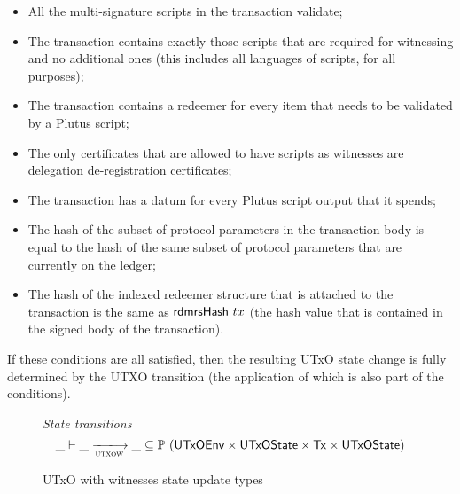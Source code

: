 \begin{itemize}

    \item All the multi-signature scripts in the transaction validate;

    \item The transaction contains exactly those scripts that are required for witnessing and no
    additional ones (this includes all languages of scripts, for all purposes);

    \item The transaction contains a redeemer for every item that needs to be  validated
      by a Plutus script;

    \item The only certificates that are allowed to have scripts as witnesses
    are delegation de-registration certificates;

    \item The transaction has a datum for every Plutus script output that it spends;

    \item
    The hash of the subset of protocol parameters in the transaction body is equal to
    the hash of the same subset of protocol parameters that are currently on the ledger;

    \item The hash of the indexed redeemer structure that is attached to the transaction is
    the same as $\mathsf{rdmrsHash}~{tx}$ (the hash value that is contained in the signed body of
    the transaction).

\end{itemize}

If these conditions are all satisfied, then the resulting UTxO state change is fully determined
by the UTXO transition (the application of which is also part of the conditions).

\begin{figure}[htb]
  \emph{State transitions}
  \begin{equation*}
    \_ \vdash
    \var{\_} \trans{utxow}{\_} \var{\_}
    \subseteq \powerset (\UTxOEnv \times \UTxOState \times \Tx \times \UTxOState)
  \end{equation*}
  \caption{UTxO with witnesses state update types}
  \label{fig:ts-types:utxo-witness}
\end{figure}

